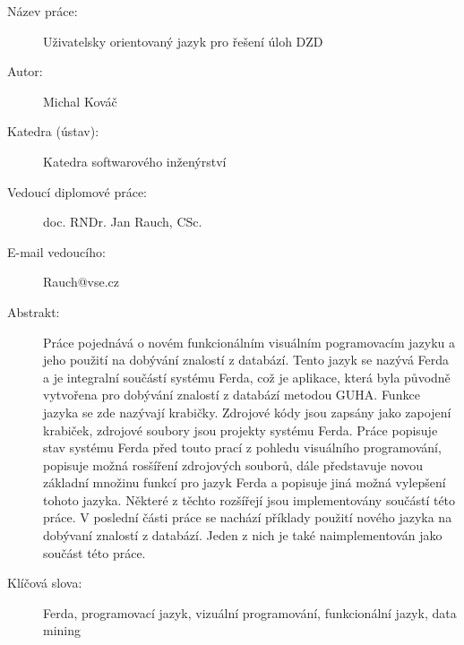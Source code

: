 \documentclass[a4paper,12pt]{book}
\begin{document}
\newpage
{\footnotesize
{}
\begin{description}
 \item [Název práce:] Uživatelsky orientovaný jazyk pro řešení úloh DZD
 \item [Autor:] Michal Kováč
 \item [Katedra (ústav):] Katedra softwarového inženýrství
 \item [Vedoucí diplomové práce:] doc. RNDr. Jan Rauch, CSc.
 \item [E-mail vedoucího:] Rauch@vse.cz
 \item [Abstrakt:] Práce pojednává o novém funkcionálním visuálním pogramovacím jazyku a jeho použití na dobývání znalostí z databází. Tento jazyk se nazývá Ferda a je integralní součástí systému Ferda, což je aplikace, která byla původně vytvořena pro dobývání znalostí z databází metodou GUHA. Funkce jazyka se zde nazývají krabičky. Zdrojové kódy jsou zapsány jako zapojení krabiček, zdrojové soubory jsou projekty systému Ferda. Práce popisuje stav systému Ferda před touto prací z pohledu visuálního programování, popisuje možná rosšíření zdrojových souborů, dále představuje novou základní množinu funkcí pro jazyk Ferda a popisuje jiná možná vylepšení tohoto jazyka. Některé z těchto rozšířejí jsou implementovány součástí této práce. V poslední části práce se nachází příklady použití nového jazyka na dobývaní znalostí z databází. Jeden z nich je také naimplementován jako součást této práce.

 \item [Klíčová slova:] Ferda, programovací jazyk, vizuální programování, funkcionální jazyk, data mining
\end{description}

\medskip

}
\end{document}
